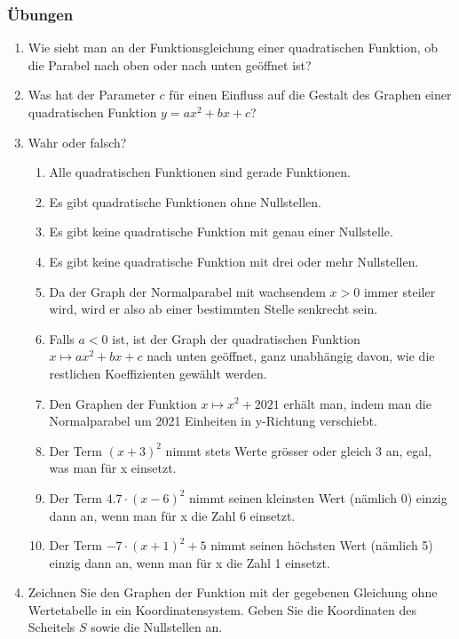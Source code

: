 \subsubsection{Übungen}
\begin{enumerate}
    \item Wie sieht man an der Funktionsgleichung einer quadratischen Funktion, ob die Parabel nach oben oder nach unten geöffnet ist?
    \item Was hat der Parameter $c$ für einen Einfluss auf die Gestalt des Graphen einer quadratischen Funktion $y=ax^2+bx+c$?
    \item Wahr oder falsch?
          \begin{enumerate}
              \item Alle quadratischen Funktionen sind gerade Funktionen.
              \item Es gibt quadratische Funktionen ohne Nullstellen.
              \item Es gibt keine quadratische Funktion mit genau einer Nullstelle.
              \item Es gibt keine quadratische Funktion mit drei oder mehr Nullstellen.
              \item Da der Graph der Normalparabel mit wachsendem  $x > 0$  immer steiler wird, wird er also ab einer bestimmten Stelle senkrecht sein.
              \item Falls  $a < 0$  ist, ist der Graph der quadratischen Funktion  $x\mapsto ax^2+bx+c$  nach unten geöffnet, ganz unabhängig davon, wie die restlichen Koeffizienten gewählt werden.
              \item Den Graphen der Funktion  $x \mapsto x^2   + 2021$  erhält man, indem man die Normalparabel um 2021 Einheiten in y-Richtung verschiebt.
              \item Der Term $(x+3)^2$ nimmt stets Werte grösser oder gleich 3 an, egal, was man für x einsetzt.
              \item Der Term $4.7\cdot (x-6)^2$ nimmt seinen kleinsten Wert (nämlich 0) einzig dann an, wenn man für x die Zahl 6 einsetzt.
              \item Der Term  $− 7\cdot ( x + 1 )^2+ 5$  nimmt seinen höchsten Wert (nämlich 5) einzig dann an, wenn man für x die Zahl 1 einsetzt.
          \end{enumerate}
    \item Zeichnen Sie den Graphen der Funktion mit der gegebenen Gleichung ohne Wertetabelle in ein Koordinatensystem. Geben Sie die Koordinaten des Scheitels $S$ sowie die Nullstellen an.

\end{enumerate}
